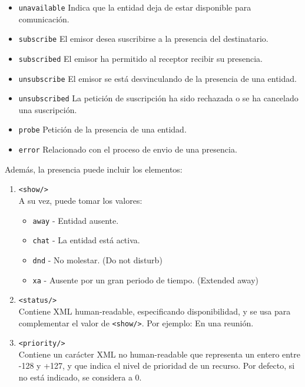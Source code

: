 \documentclass[a4paper, 11pt]{article} %
\begin{document}
      \begin{itemize}
      \item \texttt{unavailable} Indica que la entidad deja de estar disponible para comunicación.
      \item \texttt{subscribe} El emisor desea suscribirse a la presencia del destinatario. %
      \item \texttt{subscribed} El emisor ha permitido al receptor recibir su presencia.
      \item \texttt{unsubscribe} El emisor se está desvinculando de la presencia de una entidad.
      \item \texttt{unsubscribed} La petición de suscripción ha sido rechazada o se ha cancelado una suscripción.
      \item \texttt{probe} Petición de la presencia de una entidad.
      \item \texttt{error} Relacionado con el proceso de envio de una presencia.
      \end{itemize}
      
      Además, la presencia puede incluir los elementos:
      \begin{enumerate}
	\item \texttt{<show/>}\\
	A su vez, puede tomar los valores:
	\begin{itemize}
	  \item \texttt{away} - Entidad ausente.
	  \item \texttt{chat} - La entidad está activa.
	  \item \texttt{dnd} - No molestar. (Do not disturb)
	  \item \texttt{xa} - Ausente por un gran periodo de tiempo. (Extended away)
	\end{itemize}
	
	\item \texttt{<status/>}\\
	Contiene XML human-readable, especificando disponibilidad, y se usa para complementar el valor de \texttt{<show/>}.
	Por ejemplo: En una reunión.
	
	\item \texttt{<priority/>}\\
	Contiene un carácter XML no human-readable que representa un entero entre -128 y +127, y que indica el nivel
	de prioridad de un recurso. Por defecto, si no está indicado, se considera a 0.
      \end{enumerate}
\end{document}
